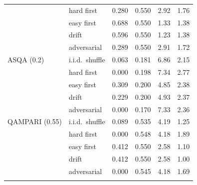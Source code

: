 \begin{table}[t]
\begin{tabular}{llrrrr}
 & hard first & 0.280 & 0.550 & 2.92 & 1.76 \\
 & easy first & 0.688 & 0.550 & 1.33 & 1.38 \\
 & drift & 0.596 & 0.550 & 1.23 & 1.38 \\
 & adversarial & 0.289 & 0.550 & 2.91 & 1.72 \\
\addlinespace[2pt]
ASQA (0.2) & i.i.d.\ shuffle & 0.063 & 0.181 & 6.86 & 2.15 \\
 & hard first & 0.000 & 0.198 & 7.34 & 2.77 \\
 & easy first & 0.309 & 0.200 & 4.85 & 2.38 \\
 & drift & 0.229 & 0.200 & 4.93 & 2.37 \\
 & adversarial & 0.000 & 0.170 & 7.33 & 2.36 \\
\addlinespace[2pt]
QAMPARI (0.55) & i.i.d.\ shuffle & 0.089 & 0.535 & 4.19 & 1.25 \\
 & hard first & 0.000 & 0.548 & 4.18 & 1.89 \\
 & easy first & 0.412 & 0.550 & 2.58 & 1.10 \\
 & drift & 0.412 & 0.550 & 2.58 & 1.00 \\
 & adversarial & 0.000 & 0.545 & 4.18 & 1.69 \\
\addlinespace[2pt]
\bottomrule
\end{tabular}
\end{table}
